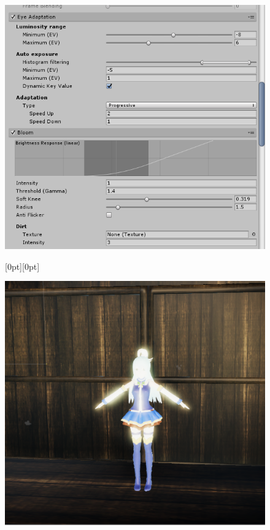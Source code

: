 \documentclass[a4paper, 13pt]{extarticle}
\begin{document}
{\begin{figure}[h]
{\begin{minipage}{0.45\textwidth}
 		\centering
 		\label{fig:test36}
 	\end{minipage}  
 \begin{minipage}{0.45\textwidth}
 	\centering
 	\includegraphics[width=0.8\linewidth]{intructions/Tone_mapper2.png}
 	\centering
 	\label{fig:test37}
 \end{minipage} 
\raisebox{-65mm}[0pt][0pt]{
\centering
 \hspace*{-11cm}
\begin{minipage}{0.45\textwidth}
	\centering
	\includegraphics[width=0.8\linewidth]{intructions/bloom.png}
	\centering
	\label{fig:test38}
\end{minipage}    
}
}	
 \end{figure} 
\newpage
}
\end{document}
